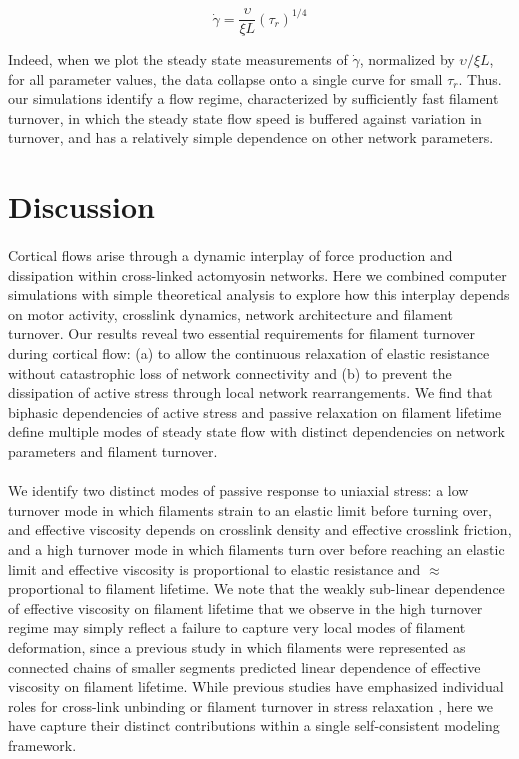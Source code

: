 \begin{equation}
	\label{eqn:flow_scaling_eq}
	\dot{\gamma} = \frac{\upsilon}{\xi L}  \left ( \tau_r \right ) ^{1/4}
\end{equation}

Indeed, when we plot the steady state measurements of $\dot{\gamma}$, normalized by $\upsilon/\xi L$,  for all parameter values, the data collapse onto a single curve for small $\tau_r$.  Thus. our simulations identify a flow regime, characterized by sufficiently fast filament turnover, in which the steady state flow speed is buffered against variation in turnover, and has a relatively simple dependence on other network parameters.



\section{Discussion}

\paragraph{} Cortical flows arise through a dynamic interplay of force production and dissipation within cross-linked actomyosin networks. Here we combined computer simulations with simple theoretical analysis to explore how this interplay depends on motor activity, crosslink dynamics, network architecture and filament turnover. Our results reveal two essential requirements for filament turnover during cortical flow:  (a) to allow the continuous relaxation of elastic resistance without catastrophic loss of network connectivity and (b) to prevent the dissipation of active stress through local network rearrangements. We find that biphasic dependencies of active stress and passive relaxation on filament lifetime define multiple modes of steady state flow with distinct dependencies on network parameters and filament turnover.


\paragraph{} We identify two distinct modes of passive response to uniaxial stress:  a low turnover mode in which filaments strain to an elastic limit before turning over, and effective viscosity depends on crosslink density and effective crosslink friction, and a high turnover mode in which filaments turn over before reaching an elastic limit and effective viscosity is proportional to elastic resistance and $\approx$ proportional to filament lifetime. We note that the weakly sub-linear dependence of effective viscosity on filament lifetime that we observe in the high turnover regime may simply reflect a failure to capture very local modes of filament deformation, since a previous study \cite{Kim2014526} in which filaments were represented as connected chains of smaller segments predicted linear dependence of effective viscosity on filament lifetime. While previous studies have emphasized individual roles for cross-link unbinding or filament turnover in stress relaxation \cite{De-La-Cruz:2015aa,De-La-Cruz:2009aa,Salbreux2012536}, here we have capture their distinct contributions within a single self-consistent modeling framework. 

